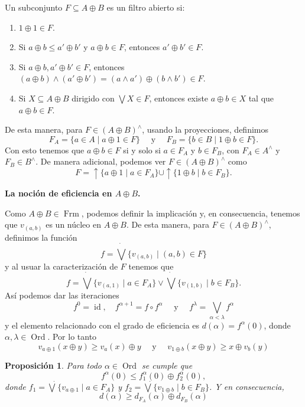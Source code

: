 \documentclass[11pt]{amsart}
\DeclareMathOperator{\id}{id}
\DeclareMathOperator{\Ord}{Ord}
\DeclareMathOperator{\Frm}{Frm}
\theoremstyle{plain}
\newtheorem{prop}[thm]{Proposición}
\theoremstyle{definition}
\begin{document}
Un subconjunto $F\subseteq A\oplus B$ es un filtro abierto si:
\begin{enumerate}
\item $1\oplus 1\in F$.
\item Si $a\oplus b\leq a'\oplus b'$ y $a\oplus b\in F$, entonces $a'\oplus b'\in F$.
\item Si $a\oplus b, a'\oplus b'\in F$, entonces $(a\oplus b)\wedge (a'\oplus b')=(a\wedge a')\oplus (b\wedge b')\in F$.
\item Si $X\subseteq A\oplus B$ dirigido con $\bigvee X\in F$, entonces existe $a\oplus b\in X$ tal que $a\oplus b\in F$.
\end{enumerate}

De esta manera, para $F\in (A\oplus B)^\wedge$, usando la proyecciones, definimos
\[
F_A=\{a\in A\mid a\oplus 1\in F\}\quad \mbox{ y }\quad F_B=\{b\in B\mid 1\oplus b\in F\}.
\]
Con esto tenemos que $a\oplus b\in F$ si y solo si $a\in F_A$ y $b\in F_B$, con $F_A\in A^\wedge$ y $F_B\in B^\wedge$. De manera adicional, podemos ver $F\in (A\oplus B)^\wedge$ como
\[
F=\uparrow \{a\oplus 1\mid a\in F_A\}\cup \uparrow \{1\oplus b\mid b\in F_B\}.
\]

\textbf{La noción de eficiencia en $A\oplus B$.}

Como $A\oplus B\in \Frm$, podemos definir la implicación y, en consecuencia, tenemos que $v_{(a,b)}$ es un núcleo en $A\oplus B$. De esta manera, para $F\in (A\oplus B)^\wedge$, definimos la función
\[
f=\dot{\bigvee}\{v_{(a,b)}\mid (a,b)\in F\}
\]
y al usuar la caracterización de $F$ tenemos que 
\[
f=\dot{\bigvee}\{v_{(a,1)}\mid a\in F_A\}\vee \dot{\bigvee}\{v_{(1,b)}\mid b\in F_B\}.
\]
Así podemos dar las iteraciones 
\[
f^0=\id, \quad f^{\alpha+1}=f\circ f^\alpha\quad \mbox{ y }\quad f^\lambda=\bigvee_{\alpha<\lambda}f^\alpha
\]
y el elemento relacionado con el grado de eficiencia es $d(\alpha)=f^\alpha(0)$, donde $\alpha, \lambda \in \Ord$. Por lo tanto 
\[
v_{a\oplus 1}(x\oplus y)\geq  v_a(x)\oplus y\quad \mbox{ y }\quad v_{1\oplus b}(x\oplus y)\geq x\oplus v_b(y)
\]

\begin{prop}\label{iteracion de f}
Para todo $\alpha\in \Ord$ se cumple que 
\begin{equation}\label{desigualdad f}
f^\alpha(0)\leq f_1^\alpha(0)\oplus f_2^\alpha(0),
\end{equation}
donde $f_1=\dot{\bigvee}\{v_{a\oplus 1}\mid a\in F_A\}$ y $f_2=\dot{\bigvee}\{v_{1\oplus b}\mid b\in F_B\}$. Y en consecuencia, 
\begin{equation}\label{desigualdad d}
d(\alpha)\geq d_{F_A}(\alpha)\oplus d_{F_B}(\alpha)
\end{equation}
\end{prop}
\end{document}
